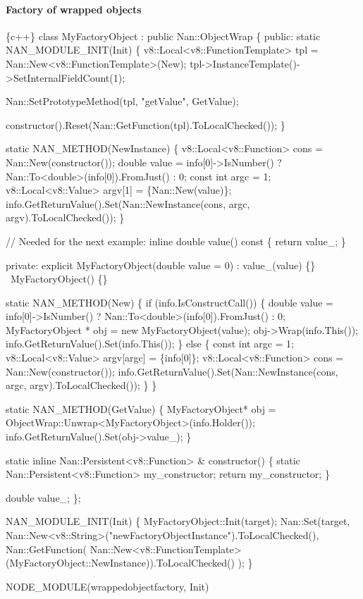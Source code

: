 \paragraph*{Factory of wrapped objects}


\begin{DoxyCode}
\{c++\}
class MyFactoryObject : public Nan::ObjectWrap \{
 public:
  static NAN\_MODULE\_INIT(Init) \{
    v8::Local<v8::FunctionTemplate> tpl = Nan::New<v8::FunctionTemplate>(New);
    tpl->InstanceTemplate()->SetInternalFieldCount(1);

    Nan::SetPrototypeMethod(tpl, "getValue", GetValue);

    constructor().Reset(Nan::GetFunction(tpl).ToLocalChecked());
  \}

  static NAN\_METHOD(NewInstance) \{
    v8::Local<v8::Function> cons = Nan::New(constructor());
    double value = info[0]->IsNumber() ? Nan::To<double>(info[0]).FromJust() : 0;
    const int argc = 1;
    v8::Local<v8::Value> argv[1] = \{Nan::New(value)\};
    info.GetReturnValue().Set(Nan::NewInstance(cons, argc, argv).ToLocalChecked());
  \}

  // Needed for the next example:
  inline double value() const \{
    return value\_;
  \}

 private:
  explicit MyFactoryObject(double value = 0) : value\_(value) \{\}
  ~MyFactoryObject() \{\}

  static NAN\_METHOD(New) \{
    if (info.IsConstructCall()) \{
      double value = info[0]->IsNumber() ? Nan::To<double>(info[0]).FromJust() : 0;
      MyFactoryObject * obj = new MyFactoryObject(value);
      obj->Wrap(info.This());
      info.GetReturnValue().Set(info.This());
    \} else \{
      const int argc = 1;
      v8::Local<v8::Value> argv[argc] = \{info[0]\};
      v8::Local<v8::Function> cons = Nan::New(constructor());
      info.GetReturnValue().Set(Nan::NewInstance(cons, argc, argv).ToLocalChecked());
    \}
  \}

  static NAN\_METHOD(GetValue) \{
    MyFactoryObject* obj = ObjectWrap::Unwrap<MyFactoryObject>(info.Holder());
    info.GetReturnValue().Set(obj->value\_);
  \}

  static inline Nan::Persistent<v8::Function> & constructor() \{
    static Nan::Persistent<v8::Function> my\_constructor;
    return my\_constructor;
  \}

  double value\_;
\};

NAN\_MODULE\_INIT(Init) \{
  MyFactoryObject::Init(target);
  Nan::Set(target,
    Nan::New<v8::String>("newFactoryObjectInstance").ToLocalChecked(),
    Nan::GetFunction(
      Nan::New<v8::FunctionTemplate>(MyFactoryObject::NewInstance)).ToLocalChecked()
  );
\}

NODE\_MODULE(wrappedobjectfactory, Init)
\end{DoxyCode}


